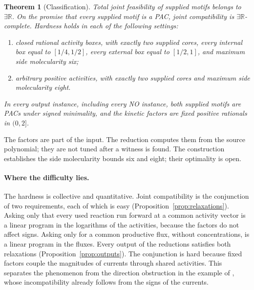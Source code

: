 \documentclass[11pt,a4paper]{article}
\theoremstyle{plain}
\newtheorem{theorem}{Theorem}[section]
\theoremstyle{definition}
\theoremstyle{remark}
\newcommand{\ER}{\exists\mathbb{R}}
\begin{document}
\begin{theorem}[Classification]\label{thm:main}
Total joint feasibility of supplied motifs belongs to $\ER$. On the promise that every supplied motif is a PAC, joint compatibility is $\ER$-complete. Hardness holds in each of the following settings:
\begin{enumerate}[label=\textup{(\roman*)}]
\item closed rational activity boxes, with exactly two supplied cores, every internal box equal to $[1/4,1/2]$, every external box equal to $[1/2,1]$, and maximum side molecularity six;
\item arbitrary positive activities, with exactly two supplied cores and maximum side molecularity eight.
\end{enumerate}
In every output instance, including every NO instance, both supplied motifs are PACs under signed minimality, and the kinetic factors are fixed positive rationals in $(0,2]$.
\end{theorem}

The factors are part of the input. The reduction computes them from the source polynomial; they are not tuned after a witness is found. The construction establishes the side molecularity bounds six and eight; their optimality is open.

\paragraph{Where the difficulty lies.}
The hardness is collective and quantitative. Joint compatibility is the conjunction of two requirements, each of which is easy (Proposition~\ref{prop:relaxations}). Asking only that every used reaction run forward at a common activity vector is a linear program in the logarithms of the activities, because the factors do not affect signs. Asking only for a common productive flux, without concentrations, is a linear program in the fluxes. Every output of the reductions satisfies both relaxations (Proposition~\ref{prop:outputs}). The conjunction is hard because fixed factors couple the magnitudes of currents through shared activities. This separates the phenomenon from the direction obstruction in the example of \citep{kosc2025}, whose incompatibility already follows from the signs of the currents.
\end{document}
